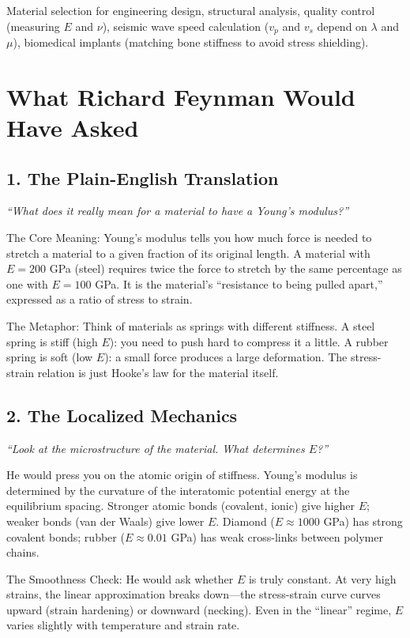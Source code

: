 Material selection for engineering design, structural analysis, quality control (measuring $E$ and $\nu$), seismic wave speed calculation ($v_p$ and $v_s$ depend on $\lambda$ and $\mu$), biomedical implants (matching bone stiffness to avoid stress shielding).
\section*{What Richard Feynman Would Have Asked}

\subsection*{1. The Plain-English Translation}
\textit{``What does it really mean for a material to have a Young's modulus?''}

The Core Meaning: Young's modulus tells you how much force is needed to stretch a material to a given fraction of its original length. A material with $E = 200$ GPa (steel) requires twice the force to stretch by the same percentage as one with $E = 100$ GPa. It is the material's ``resistance to being pulled apart,'' expressed as a ratio of stress to strain.

The Metaphor: Think of materials as springs with different stiffness. A steel spring is stiff (high $E$): you need to push hard to compress it a little. A rubber spring is soft (low $E$): a small force produces a large deformation. The stress-strain relation is just Hooke's law for the material itself.

\subsection*{2. The Localized Mechanics}
\textit{``Look at the microstructure of the material. What determines $E$?''}

He would press you on the atomic origin of stiffness. Young's modulus is determined by the curvature of the interatomic potential energy at the equilibrium spacing. Stronger atomic bonds (covalent, ionic) give higher $E$; weaker bonds (van der Waals) give lower $E$. Diamond ($E \approx 1000$ GPa) has strong covalent bonds; rubber ($E \approx 0.01$ GPa) has weak cross-links between polymer chains.

The Smoothness Check: He would ask whether $E$ is truly constant. At very high strains, the linear approximation breaks down---the stress-strain curve curves upward (strain hardening) or downward (necking). Even in the ``linear'' regime, $E$ varies slightly with temperature and strain rate.

